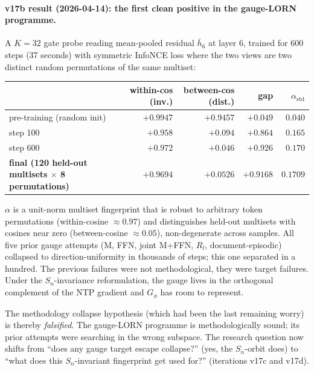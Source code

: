 \documentclass[11pt, a4paper]{article}
\theoremstyle{plain}
\theoremstyle{definition}
\theoremstyle{remark}
\begin{document}
\paragraph{v17b result (2026-04-14): the first clean positive in the gauge-LORN programme.}
A $K{=}32$ gate probe reading mean-pooled residual $\bar h_6$ at layer 6, trained for 600 steps (37 seconds) with symmetric InfoNCE loss where the two views are two distinct random permutations of the same multiset:
\begin{center}
\small
\begin{tabular}{lrrrr}
\toprule
& within-cos (inv.) & between-cos (dist.) & gap & $\alpha_{\mathrm{std}}$ \\
\midrule
pre-training (random init)  & $+0.9947$ & $+0.9457$ & $+0.049$ & $0.040$ \\
step 100                    & $+0.958$  & $+0.094$  & $+0.864$ & $0.165$ \\
step 600                    & $+0.972$  & $+0.046$  & $+0.926$ & $0.170$ \\
\textbf{final (120 held-out multisets $\times$ 8 permutations)} & $\mathbf{+0.9694}$ & $\mathbf{+0.0526}$ & $\mathbf{+0.9168}$ & $\mathbf{0.1709}$ \\
\bottomrule
\end{tabular}
\end{center}
$\alpha$ is a unit-norm multiset fingerprint that is robust to arbitrary token permutations (within-cosine $\approx 0.97$) and distinguishes held-out multisets with cosines near zero (between-cosine $\approx 0.05$), non-degenerate across samples.
All five prior gauge attempts (M, FFN, joint M+FFN, $R_l$, document-episodic) collapsed to direction-uniformity in thousands of steps; this one separated in a hundred.
The previous failures were not methodological, they were target failures.
Under the $S_n$-invariance reformulation, the gauge lives in the orthogonal complement of the NTP gradient and $G_\phi$ has room to represent.

The methodology collapse hypothesis (which had been the last remaining worry) is thereby \emph{falsified}.
The gauge-LORN programme is methodologically sound; its prior attempts were searching in the wrong subspace.
The research question now shifts from ``does any gauge target escape collapse?'' (yes, the $S_n$-orbit does) to ``what does this $S_n$-invariant fingerprint get used for?'' (iterations v17c and v17d).
\end{document}
